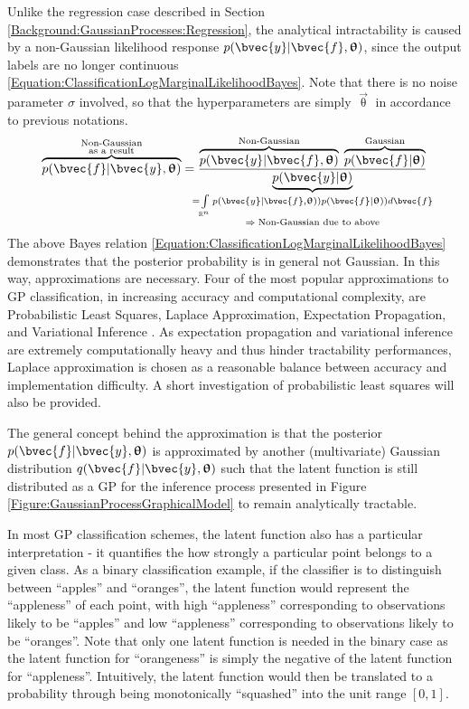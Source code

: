 		Unlike the regression case described in Section \ref{Background:GaussianProcesses:Regression}, the analytical intractability is caused by a non-Gaussian likelihood response $p(\bvec{y} | \bvec{f}, \vec{\uptheta})$, since the output labels are no longer continuous \eqref{Equation:ClassificationLogMarginalLikelihoodBayes}. Note that there is no noise parameter $\sigma$ involved, so that the hyperparameters are simply $\vec{\uptheta}$ in accordance to previous notations. \begin{equation}
			\overbrace{p(\bvec{f} | \bvec{y}, \vec{\uptheta})}^{\mathclap{\substack{\text{Non-Gaussian} \\ \text{as a result}}}} = \frac{\overbrace{p(\bvec{y} | \bvec{f}, \vec{\uptheta})}^{\text{Non-Gaussian}} \; \overbrace{p(\bvec{f} | \vec{\uptheta})}^{\text{Gaussian}}}{\underbrace{p(\bvec{y} | \vec{\uptheta})}_{\mathclap{\substack{= \int\limits_{\mathbb{R}^{n}} p(\bvec{y} | \bvec{f}, \vec{\uptheta})) p(\bvec{f} | \vec{\uptheta})) d\bvec{f} \\ \Rightarrow \; \text{Non-Gaussian due to above}}}}}
		\label{Equation:ClassificationLogMarginalLikelihoodBayes}
		\end{equation} The above Bayes relation \eqref{Equation:ClassificationLogMarginalLikelihoodBayes} demonstrates that the posterior probability is in general not Gaussian. In this way, approximations are necessary. Four of the most popular approximations to GP classification, in increasing accuracy and computational complexity, are Probabilistic Least Squares, Laplace Approximation, Expectation Propagation, and Variational Inference \citep{GaussianProcessForMachineLearning}. As expectation propagation and variational inference are extremely computationally heavy and thus hinder tractability performances, Laplace approximation is chosen as a reasonable balance between accuracy and implementation difficulty. A short investigation of probabilistic least squares will also be provided.
		
		The general concept behind the approximation is that the posterior $p(\bvec{f} | \bvec{y}, \vec{\uptheta})$ is approximated by another (multivariate) Gaussian distribution $q(\bvec{f} | \bvec{y}, \vec{\uptheta})$ such that the latent function is still distributed as a GP for the inference process presented in Figure \ref{Figure:GaussianProcessGraphicalModel} to remain analytically tractable.
		
		In most GP classification schemes, the latent function also has a particular interpretation - it quantifies the how strongly a particular point belongs to a given class. As a binary classification example, if the classifier is to distinguish between ``apples'' and ``oranges'', the latent function would represent the ``appleness'' of each point, with high ``appleness'' corresponding to observations likely to be ``apples'' and low ``appleness'' corresponding to observations likely to be ``oranges''. Note that only one latent function is needed in the binary case as the latent function for ``orangeness'' is simply the negative of the latent function for ``appleness''. Intuitively, the latent function would then be translated to a probability through being monotonically ``squashed'' into the unit range $[0, 1]$.
		
